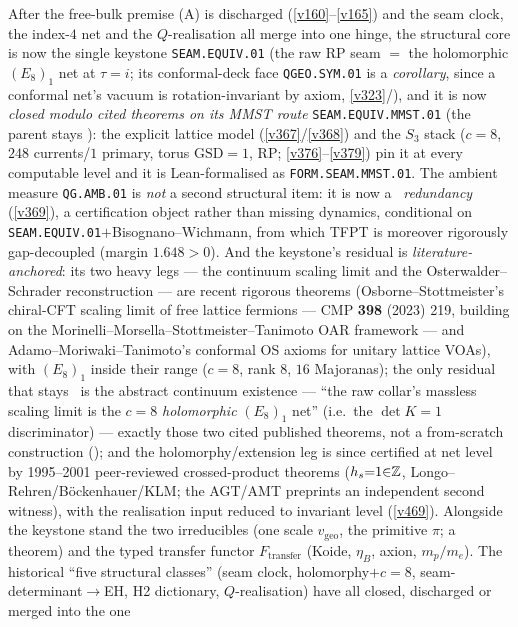 \begin{keybox}
After the free-bulk premise (A) is discharged (\vref{v160}--\vref{v165}) and the seam clock, the index-$4$
net and the $Q$-realisation all merge into one hinge, the structural core is now the single keystone
\texttt{SEAM.EQUIV.01} (the raw RP seam $=$ the holomorphic $(E_8)_1$ net at
$\tau{=}i$; its conformal-deck face \texttt{QGEO.SYM.01} is a \emph{corollary}, since a conformal net's vacuum is
rotation-invariant by axiom, \vref{v323}/), and it is now \emph{closed modulo
cited theorems on its MMST route} \texttt{SEAM.EQUIV.MMST.01} (the parent stays \mO): the explicit lattice model (\vref{v367}/\vref{v368}) and the $S_3$ stack ($c{=}8$, $248$ currents/$1$
primary, torus $\mathrm{GSD}{=}1$, RP; \vref{v376}--\vref{v379}) pin it at every computable level and it is
Lean-formalised as \texttt{FORM.SEAM.MMST.01}.  The ambient measure
\texttt{QG.AMB.01} is \emph{not} a second structural item: it is now a \mC\ \emph{redundancy} (\vref{v369}), a
certification object rather than missing dynamics, conditional on \texttt{SEAM.EQUIV.01}${+}$Bisognano--Wichmann,
from which TFPT is moreover rigorously gap-decoupled (margin $1.648>0$).  And the keystone's residual is
\emph{literature-anchored}: its two heavy legs ---
the continuum scaling limit and the Osterwalder--Schrader reconstruction --- are recent rigorous theorems
(Osborne--Stottmeister's chiral-CFT scaling limit of free lattice fermions --- CMP \textbf{398} (2023) 219,
building on the Morinelli--Morsella--Stottmeister--Tanimoto OAR framework --- and
Adamo--Moriwaki--Tanimoto's conformal OS axioms for unitary lattice VOAs), with $(E_8)_1$ inside their range
($c{=}8$, rank $8$, $16$ Majoranas); the only residual that stays \mO\ is the abstract continuum existence ---
``the raw collar's massless scaling limit is the $c{=}8$ \emph{holomorphic} $(E_8)_1$ net'' (i.e.\ the $\det K{=}1$
discriminator) --- exactly those two cited published theorems, not a from-scratch
construction (); and the holomorphy/extension leg is since certified at net
level by 1995--2001 peer-reviewed crossed-product theorems ($h_s{=}1{\in}\mathbb Z$, Longo--Rehren/B\"ockenhauer/KLM;
the AGT/AMT preprints an independent second witness), with the realisation input reduced to invariant level
(\vref{v469}).  Alongside the keystone stand the two irreducibles (one scale
$v_{\mathrm{geo}}$, the primitive $\pi$; a theorem) and the typed transfer functor $F_{\mathrm{transfer}}$ (Koide,
$\eta_B$, axion, $m_p/m_e$). The historical ``five structural classes'' (seam clock, holomorphy$+c{=}8$,
seam-determinant$\to$EH, H2 dictionary, $Q$-realisation) have all closed, discharged or merged into the one

\end{keybox}

